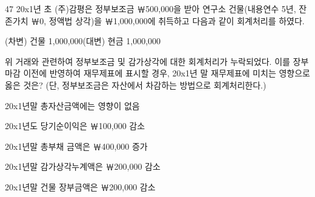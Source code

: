 \begin{question}{47}
20x1년 초 (주)감평은 정부보조금 ￦500,000을 받아 연구소 건물(내용연수 5년, 잔존가치 ￦0, 정액법 상각)을 ￦1,000,000에 취득하고 다음과 같이 회계처리를 하였다.
\begin{framedtext}
\centering (차변) 건물 1,000,000\qquad\qquad (대변) 현금 1,000,000
\end{framedtext}
위 거래와 관련하여 정부보조금 및 감가상각에 대한 회계처리가 누락되었다. 이를 장부마감 이전에 반영하여 재무제표에 표시할 경우, 20x1년 말 재무제표에 미치는 영향으로 옳은 것은? (단, 정부보조금은 자산에서 차감하는 방법으로 회계처리한다.) \par
\begin{choices}
  \item 20x1년말 총자산금액에는 영향이 없음
  \item 20x1년도 당기순이익은 ￦100,000 감소
  \item 20x1년말 총부채 금액은 ￦400,000 증가
  \item 20x1년말 감가상각누계액은 ￦200,000 감소
  \item 20x1년말 건물 장부금액은 ￦200,000 감소
\end{choices}
\end{question}
